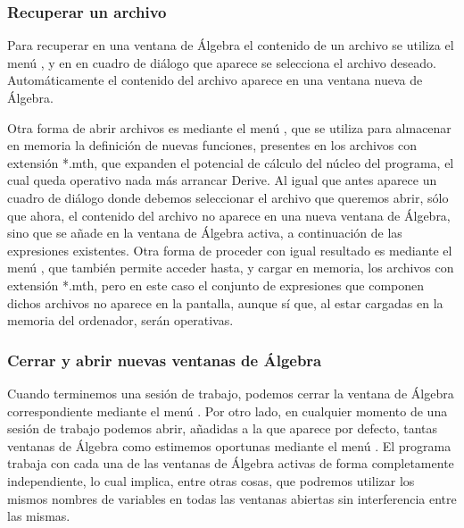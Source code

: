 \subsubsection*{Recuperar un archivo}
Para recuperar en una ventana de Álgebra el contenido de un archivo
se utiliza el menú , y en en cuadro de
diálogo que aparece se selecciona el archivo deseado.
Automáticamente el contenido del archivo aparece en una ventana
nueva de Álgebra.

Otra forma de abrir archivos es mediante el menú
, que se utiliza para almacenar en
memoria la definición de nuevas funciones, presentes en los archivos
con extensión *.mth, que expanden el potencial de cálculo del núcleo
del programa, el cual queda operativo nada más arrancar Derive. Al
igual que antes aparece un cuadro de diálogo donde debemos
seleccionar el archivo que queremos abrir, sólo que ahora, el
contenido del archivo no aparece en una nueva ventana de Álgebra,
sino que se añade en la ventana de Álgebra activa, a continuación de
las expresiones existentes. Otra forma de proceder con igual
resultado es mediante el menú ,
que también permite acceder hasta, y cargar en memoria, los archivos
con extensión *.mth, pero en este caso el conjunto de expresiones
que componen dichos archivos no aparece en la pantalla, aunque sí
que, al estar cargadas en la memoria del ordenador, serán
operativas.

\subsubsection*{Cerrar y abrir nuevas ventanas de Álgebra}
Cuando terminemos una sesión de trabajo, podemos cerrar la ventana
de Álgebra correspondiente mediante el menú
. Por otro lado, en cualquier momento de una
sesión de trabajo podemos abrir, añadidas a la que aparece por
defecto, tantas ventanas de Álgebra como estimemos oportunas
mediante el menú . El programa trabaja con
cada una de las ventanas de Álgebra activas de forma completamente
independiente, lo cual implica, entre otras cosas, que podremos
utilizar los mismos nombres de variables en todas las ventanas
abiertas sin interferencia entre las mismas.

